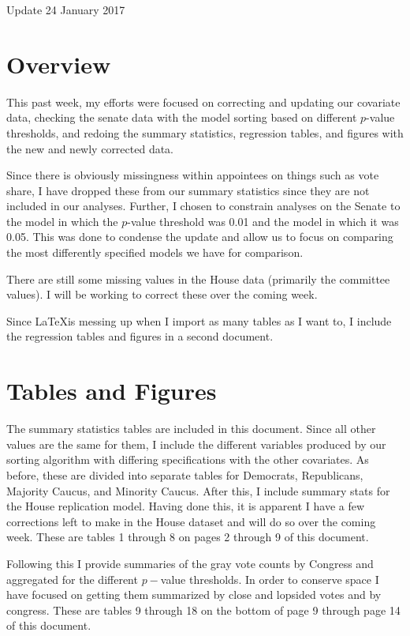 \documentclass[12pt]{article}
\begin{document}
	

\begin{center}
	\Large Update 24 January 2017
\end{center}


\section{Overview}

This past week, my efforts were focused on correcting and updating our covariate data, checking the senate data with the model sorting based on different $p$-value thresholds, and redoing the summary statistics, regression tables, and figures with the new and newly corrected data.

Since there is obviously missingness within appointees on things such as vote share, I have dropped these from our summary statistics since they are not included in our analyses. Further, I chosen to constrain analyses on the Senate to the model in which the $p$-value threshold was 0.01 and the model in which it was 0.05. This was done to condense the update and allow us to focus on comparing the most differently specified models we have for comparison.

There are still some missing values in the House data (primarily the committee values). I will be working to correct these over the coming week.

Since \LaTeX is messing up when I import as many tables as I want to, I include the regression tables and figures in a second document.

\section{Tables and Figures}

The summary statistics tables are included in this document. Since all other values are the same for them, I include the different variables produced by our sorting algorithm with differing specifications with the other covariates. As before, these are divided into separate tables for Democrats, Republicans, Majority Caucus, and Minority Caucus. After this, I include summary stats for the House replication model. Having done this, it is apparent I have a few corrections left to make in the House dataset and will do so over the coming week. These are tables 1 through 8 on pages 2 through 9 of this document.

Following this I provide summaries of the gray vote counts by Congress and aggregated for the different $p-$value thresholds. In order to conserve space I have focused on getting them summarized by close and lopsided votes and by congress. These are tables 9 through 18 on the bottom of page 9 through page 14 of this document.
\end{document}

